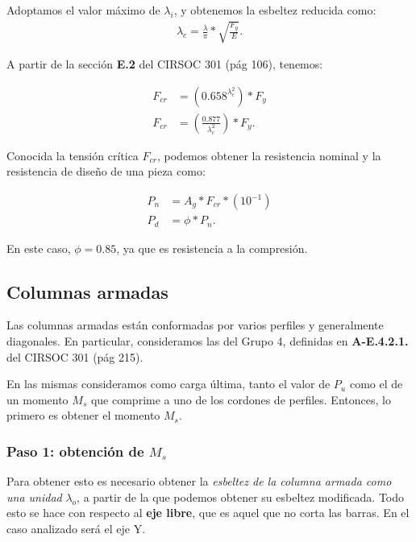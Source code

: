 \documentclass[../main.tex]{subfiles}
\begin{document}
Adoptamos el valor máximo de $\lambda_i$, y obtenemos la esbeltez reducida como:
\begin{align*}
  \lambda_c = \frac{\lambda}{\pi} * \sqrt{\frac{F_y}{E}}  
.\end{align*}

A partir de la sección \textbf{E.2} del CIRSOC 301 (pág 106), tenemos:

\begin{align*}
  F_{cr} &= \left( 0.658^{\lambda_c^2} \right)*F_y \tag{$\lambda_c \leq 1.5$}  \\[5pt]
  F_{cr} &= \left( \frac{0.877}{\lambda_c^2} \right) * F_y \tag{$\lambda_c \geq 1.5$}
.\end{align*}

Conocida la tensión crítica $F_{cr}$, podemos obtener la resistencia nominal y 
la resistencia de diseño de una pieza como:

\begin{align*}
  P_{n} &= A_g * F_{cr} * (10^{-1}) \\[5pt]
  P_{d} &= \phi * P_n
.\end{align*}

En este caso, $\phi=0.85$, ya que es resistencia a la compresión.

\subsection{Columnas armadas}

Las columnas armadas están conformadas por varios perfiles y generalmente
diagonales. En particular, consideramos las del Grupo 4, definidas en 
\textbf{A-E.4.2.1.} del CIRSOC 301 (pág 215).

En las mismas consideramos como carga última, tanto el valor de $P_u$ como el de
un momento $M_s$ que comprime a uno de los cordones de perfiles. Entonces, lo
primero es obtener el momento $M_s$.

\subsubsection{Paso 1: obtención de $M_s$}

Para obtener esto es necesario obtener la \textit{esbeltez de la columna armada
como una unidad} $\lambda_o$, a partir de la que podemos obtener su esbeltez 
modificada. Todo esto se hace con respecto al \textbf{eje libre}, que es aquel
que no corta las barras. En el caso analizado será el eje Y.
\end{document}
